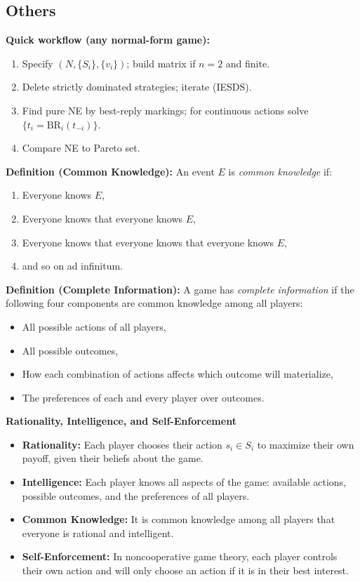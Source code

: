 \documentclass[11pt]{article}
\newcommand{\Players}{N}
\newcommand{\vi}{v_i}
\newcommand{\BR}{\mathrm{BR}}
\begin{document}
\begin{multicols}{2}
\subsection*{Others}

\textbf{Quick workflow (any normal-form game):}
\begin{enumerate}[leftmargin=*,itemsep=1pt,topsep=2pt]
  \item Specify $(\Players,\{S_i\},\{\vi\})$; build matrix if $n=2$ and finite.
  \item Delete strictly dominated strategies; iterate (IESDS).
  \item Find pure NE by best-reply markings; for continuous actions solve $\{t_i=\BR_i(t_{-i})\}$.
  \item Compare NE to Pareto set.
\end{enumerate}

  \textbf{Definition (Common Knowledge):} An event $E$ is \emph{common knowledge} if:
  \begin{enumerate}[label=\arabic*)]
    \item Everyone knows $E$,
    \item Everyone knows that everyone knows $E$,
    \item Everyone knows that everyone knows that everyone knows $E$,
    \item and so on ad infinitum.
  \end{enumerate}

  \textbf{Definition (Complete Information):} A game has \emph{complete information} if the following four components are common knowledge among all players:
  \begin{itemize}
    \item All possible actions of all players,
    \item All possible outcomes,
    \item How each combination of actions affects which outcome will materialize,
    \item The preferences of each and every player over outcomes.
  \end{itemize}


  \textbf{Rationality, Intelligence, and Self-Enforcement}

  \begin{itemize}
    \item \textbf{Rationality:} Each player chooses their action $s_i \in S_i$ to maximize their own payoff, given their beliefs about the game.
    \item \textbf{Intelligence:} Each player knows all aspects of the game: available actions, possible outcomes, and the preferences of all players.
    \item \textbf{Common Knowledge:} It is common knowledge among all players that everyone is rational and intelligent.
    \item \textbf{Self-Enforcement:} In noncooperative game theory, each player controls their own action and will only choose an action if it is in their best interest.
  \end{itemize}




\end{multicols}
\end{document}
